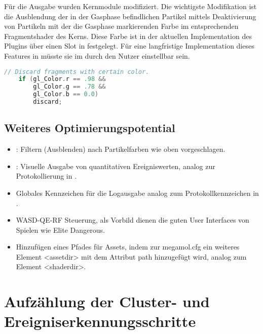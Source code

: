 Für die Ausgabe wurden Kernmodule modifiziert. Die wichtigste Modifikation ist die Ausblendung der in der Gasphase befindlichen Partikel mittels Deaktivierung von Partikeln mit der die Gasphase markierenden Farbe im entsprechenden Fragmentshader des  Kerns. Diese Farbe ist in der aktuellen Implementation des Plugins über einen Slot in \SECalc festgelegt. Für eine langfristige Implementation dieses Features in  müsste sie im  durch den Nutzer einstellbar sein.

\begin{lstlisting}[language=c]
    // Discard fragments with certain color.
    if (gl_Color.r == .98 &&
	    gl_Color.g == .78 &&
	    gl_Color.b == 0.0)
	    discard;
\end{lstlisting}

\subsection*{Weiteres Optimierungspotential}\label{sec:pluginaufbau-optimierung}

\begin{itemize}
	\item {}: Filtern (Ausblenden) nach Partikelfarben wie oben vorgeschlagen.
	\item {}: Visuelle Ausgabe von quantitativen Ereigniswerten, analog zur Protokollierung in \SECalc.
	\item Globales Kennzeichen für die Logausgabe analog zum Protokollkennzeichen in \SECalc.
	\item WASD-QE-RF Steuerung, als Vorbild dienen die guten User Interfaces von Spielen wie Elite Dangerous.
	\item Hinzufügen eines Pfades für Assets, indem zur megamol.cfg ein weiteres Element <assetdir> mit dem Attribut path hinzugefügt wird, analog zum Element <shaderdir>.
\end{itemize}


\section{Aufzählung der Cluster- und Ereigniserkennungsschritte}\label{sec:cluster-ereignis-schritte}

